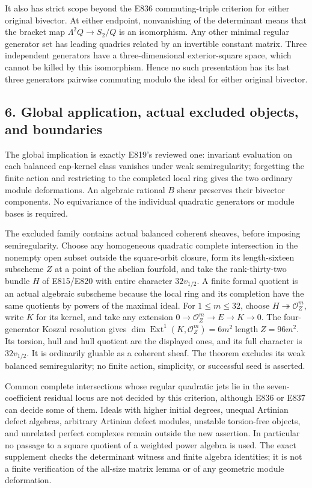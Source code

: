 It also has strict scope beyond the E836 commuting-triple criterion for
either original bivector. At either endpoint, nonvanishing of the
determinant means that the bracket map \(\Lambda^2Q\to S_2/Q\) is an
isomorphism. Any other minimal regular generator set has leading
quadrics related by an invertible constant matrix. Three independent
generators have a three-dimensional exterior-square space, which cannot
be killed by this isomorphism. Hence no such presentation has its last
three generators pairwise commuting modulo the ideal for either original
bivector.

\subsection{6. Global application, actual excluded objects, and
boundaries}\label{SF-E838:global-application-actual-excluded-objects-and-boundaries}

The global implication is exactly E819's reviewed one: invariant
evaluation on each balanced cap-kernel class vanishes under weak
semiregularity; forgetting the finite action and restricting to the
completed local ring gives the two ordinary module deformations. An
algebraic rational \(B\) shear preserves their bivector components. No
equivariance of the individual quadratic generators or module bases is
required.

The excluded family contains actual balanced coherent sheaves, before
imposing semiregularity. Choose any homogeneous quadratic complete
intersection in the nonempty open subset outside the square-orbit
closure, form its length-sixteen subscheme \(Z\) at a point of the
abelian fourfold, and take the rank-thirty-two bundle \(H\) of E815/E820
with entire character \(32v_{1/2}\). A finite formal quotient is an
actual algebraic subscheme because the local ring and its completion
have the same quotients by powers of the maximal ideal. For
\(1\le m\le32\), choose \(H\twoheadrightarrow\mathcal O_Z^m\), write
\(K\) for its kernel, and take any extension
\(0\to\mathcal O_Z^m\to E\to K\to0\). The four-generator Koszul
resolution gives
\(\dim\operatorname{Ext}^1(K,\mathcal O_Z^m)=6m^2\operatorname{length}Z=96m^2\).
Its torsion, hull and hull quotient are the displayed ones, and its full
character is \(32v_{1/2}\). It is ordinarily gluable as a coherent
sheaf. The theorem excludes its weak balanced semiregularity; no finite
action, simplicity, or successful seed is asserted.

Common complete intersections whose regular quadratic jets lie in the
seven-coefficient residual locus are not decided by this criterion,
although E836 or E837 can decide some of them. Ideals with higher
initial degrees, unequal Artinian defect algebras, arbitrary Artinian
defect modules, unstable torsion-free objects, and unrelated perfect
complexes remain outside the new assertion. In particular no passage to
a square quotient of a weighted power algebra is used. The exact
supplement checks the determinant witness and finite algebra identities;
it is not a finite verification of the all-size matrix lemma or of any
geometric module deformation.
